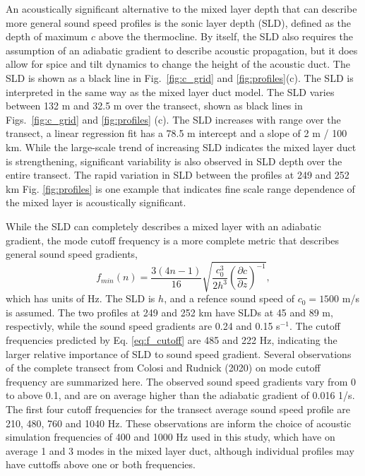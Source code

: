 \documentclass[preprint,NumberedRefs]{JASA}
\begin{document}
An acoustically significant alternative to the mixed layer depth that can describe more general sound speed profiles is the sonic layer depth (SLD), defined as the depth of maximum $c$ above the thermocline. By itself, the SLD also requires the assumption of an adiabatic gradient to describe acoustic propagation, but it does allow for spice and tilt dynamics to change the height of the acoustic duct. The SLD is shown as a black line in Fig.~\ref{fig:c_grid} and \ref{fig:profiles}(c). The SLD is interpreted in the same way as the mixed layer duct model. The SLD varies between 132 m and 32.5 m over the transect, shown as black lines in Figs.~\ref{fig:c_grid} and \ref{fig:profiles} (c). The SLD increases with range over the transect, a linear regression fit has a 78.5 m intercept and a slope of 2 m / 100 km. While the large-scale trend of increasing SLD indicates the mixed layer duct is strengthening, significant variability is also observed in SLD depth over the entire transect. The rapid variation in SLD between the profiles at 249 and 252 km Fig. \ref{fig:profiles} is one example that indicates fine scale range dependence of the mixed layer is acoustically significant.

While the SLD can completely describes a mixed layer with an adiabatic gradient, the mode cutoff frequency\citep{Urick1982Prop} is a more complete metric that describes general sound speed gradients,
\begin{equation}
    f_{min}(n) = \frac{3(4n-1)}{16} \sqrt{\frac{c_0^3}{2h^3} \left( \frac{\partial c}{\partial z} \right) ^ {-1}},
    \label{eq:f_cutoff}
\end{equation}
which has units of Hz. The SLD is $h$, and a refence sound speed of $c_0 = 1500$ m/s is assumed. The two profiles at 249 and 252 km have SLDs at 45 and 89 m, respectivly, while the sound speed gradients are 0.24 and 0.15 s$^{-1}$. The cutoff frequencies predicted by Eq. \eqref{eq:f_cutoff} are 485 and 222 Hz, indicating the larger relative importance of SLD to sound speed gradient. Several observations of the complete transect from Colosi and Rudnick (2020)\cite{colosi2020observations} on mode cutoff frequency are summarized here. The observed sound speed gradients vary from 0 to above 0.1, and are on average higher than the adiabatic gradient of 0.016 1/s. The first four cutoff frequencies for the transect average sound speed profile are 210, 480, 760 and 1040 Hz. These observations are inform the choice of acoustic simulation frequencies of 400 and 1000 Hz used in this study, which have on average 1 and 3 modes in the mixed layer duct, although individual profiles may have cuttoffs above one or both frequencies.
\end{document}
